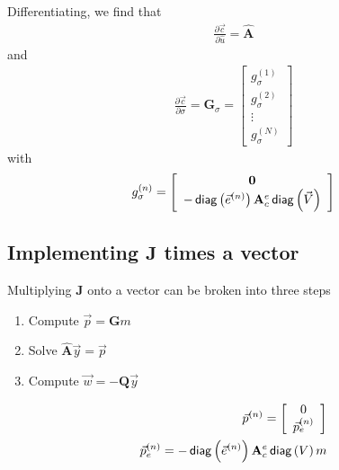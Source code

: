 \documentclass[]{article}
\newcommand{\Ace}{\ensuremath{{\mathbf A_c^e}}}
\newcommand{\diag}[1]{\, {\sf diag}\left( #1 \right)}
\newcommand {\e}  { {\vec e} }
\begin{document}
Differentiating, we find that
\begin{align}
    \frac{\partial \vec{c}}{\partial \hat{u}} = \hat{\mathbf{A}}
\end{align}
and
\begin{align}
    \frac{\partial \vec{c}}{\partial \sigma} = \mathbf{G}_\sigma = 
    \left[ 
        \begin{array}{c}
            g_\sigma^{(1)}\\
            g_\sigma^{(2)}\\
            \vdots \\
            g_\sigma^{(N)}
        \end{array}
    \right]
\end{align}
with
\begin{subequations}
    \begin{align}
        g_\sigma^{(n)} = 
        \left[ 
            \begin{array}{c}
                \mathbf{0} \\
                - \diag{\e^{(n)}} \Ace \diag{\vec{V}}
            \end{array}
        \right]
    \end{align}
\end{subequations}

\subsection{Implementing $\mathbf{J}$ times a vector}
Multiplying $\mathbf{J}$ onto a vector can be broken into three steps
\begin{enumerate}
\item Compute $\vec{p} = \mathbf{G}m$
\item Solve $\hat{\mathbf{A}} \vec{y} = \vec{p}$
\item Compute $\vec{w} = -\mathbf{Q} \vec{y}$
\end{enumerate}

\begin{subequations}
    \begin{align}
        \vec{p}^{(n)} = \left[
            \begin{array}{c}
                0 \\
                \vec{p}_e^{(n)}
            \end{array}
        \right] \\
        \vec{p}_e^{(n)} = - \diag{\e^{(n)}} \Ace \diag{V} m
    \end{align}
\end{subequations}
\end{document}
